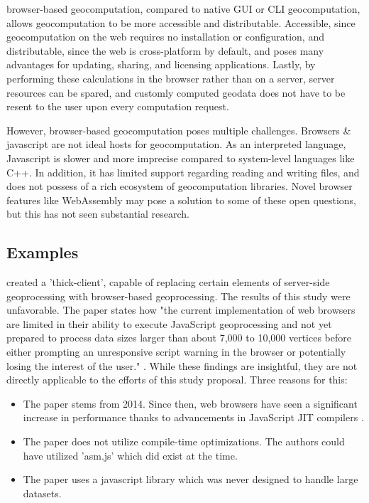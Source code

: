 browser-based geocomputation, compared to native GUI or CLI geocomputation, allows geocomputation to be more accessible and distributable. 
Accessible, since geocomputation on the web requires no installation or configuration, 
and distributable, since the web is cross-platform by default, and poses many advantages for updating, sharing, and licensing applications. 
Lastly, by performing these calculations in the browser rather than on a server, server resources can be spared, 
and customly computed geodata does not have to be resent to the user upon every computation request.

However, browser-based geocomputation poses multiple challenges. 
Browsers \& javascript are not ideal hosts for geocomputation. 
As an interpreted language, Javascript is slower and more imprecise compared to system-level languages like C++.
In addition, it has limited support regarding reading and writing files, and does not possess of a rich ecosystem of geocomputation libraries.  
Novel browser features like WebAssembly may pose a solution to some of these open questions, but this has not seen substantial research. 

\subsection{Examples}

\citet{hamilton_client-side_2014} created a 'thick-client', capable of replacing certain elements of server-side geoprocessing with browser-based geoprocessing. 
The results of this study were unfavorable. 
The paper states how "the current implementation of web browsers are limited in their ability to execute JavaScript geoprocessing and not yet prepared to process data sizes larger than about 7,000 to 10,000 vertices before either prompting an unresponsive script warning in the browser or potentially losing the interest of the user." \citep{hamilton_client-side_2014}. 
While these findings are insightful, they are not directly applicable to the efforts of this study proposal. Three reasons for this:

\begin{itemize}
  \item The paper stems from 2014. Since then, web browsers have seen a significant increase in performance thanks to advancements in JavaScript JIT compilers \citep{haas_bringing_2017, kulawiak_analysis_2019}. 
  \item The paper does not utilize compile-time optimizations. The authors could have utilized 'asm.js' \citep{mozilla_asmjs_2013} which did exist at the time. 
  \item The paper uses a javascript library which was never designed to handle large datasets.
\end{itemize}

